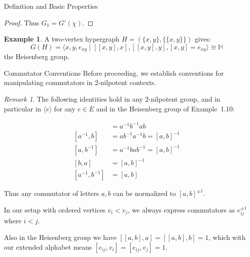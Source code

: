 \documentclass{article}
\theoremstyle{definition}
\newtheorem{example}[theorem]{Example}
\theoremstyle{remark}
\newtheorem{remark}[theorem]{Remark}
\theoremstyle{theorem}
\theoremstyle{definition}
\begin{document}
\begin{section}{Definition and Basic Properties}
\begin{proof}
Thus $G_1 = G'(\chi)$.
\end{proof}

\begin{example}
A two-vertex hypergraph $H=(\{x,y\},\{\{x,y\}\})$ gives:
$$G(H)=\langle x,y,e_{xy} \mid [[x,y],x], [[x,y],y], [x,y]=e_{xy} \rangle \cong \mathbb{H}$$
the Heisenberg group.
\end{example}

\end{section}

\begin{section}{Commutator Conventions}
Before proceeding, we establish conventions for manipulating commutators in 2-nilpotent contexts.

\begin{remark}\label{rem:commutator_identities}
The following identities hold in any 2-nilpotent group, and in particular
in $\langle e \rangle$ for any $e \in E$ and in the Heisenberg group of
Example~1.10:

    \begin{align*}
    [a,b] &= a^{-1}b^{-1}ab \\
    [a^{-1},b] &= ab^{-1}a^{-1}b = [a,b]^{-1}\\
    [a,b^{-1}] &= a^{-1}bab^{-1} = [a,b]^{-1}\\
    [b,a] &= [a,b]^{-1}\\
    [a^{-1},b^{-1}] &= [a,b]
    \end{align*}

    Thus any commutator of letters $a,b$ can be normalized to $[a,b]^{\pm 1}$.
\end{remark}

In our setup with ordered vertices $v_i < v_j$, we always express commutators as $e_{ij}^{\pm 1}$ where $i < j$.

Also in the Heisenberg group we have $[[a,b],a]=[[a,b],b]=1$, which with our extended alphabet means $[e_{ij},v_i]=[e_{ij},v_j]=1$.

\end{section}
\end{document}
